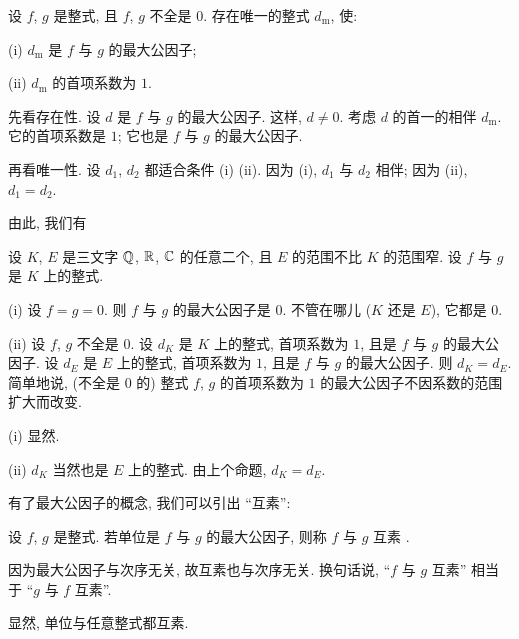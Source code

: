 \begin{proposition}
    设 $f$, $g$ 是整式, 且 $f$, $g$ 不全是 $0$. 存在唯一的整式 $d_\mathrm{m}$, 使:

    (i) $d_\mathrm{m}$ 是 $f$ 与 $g$ 的最大公因子;

    (ii) $d_\mathrm{m}$ 的首项系数为 $1$.
\end{proposition}

\begin{pf}
    先看存在性. 设 $d$ 是 $f$ 与 $g$ 的最大公因子. 这样, $d \neq 0$. 考虑 $d$ 的首一的相伴 $d_\mathrm{m}$. 它的首项系数是 $1$; 它也是 $f$ 与 $g$ 的最大公因子.

    再看唯一性. 设 $d_1$, $d_2$ 都适合条件 (i) (ii). 因为 (i), $d_1$ 与 $d_2$ 相伴; 因为 (ii), $d_1 = d_2$.
\end{pf}

由此, 我们有
\begin{proposition}
    设 $K$, $E$ 是三文字 $\mathbb{Q}$, $\mathbb{R}$, $\mathbb{C}$ 的任意二个, 且 $E$ 的范围不比 $K$ 的范围窄. 设 $f$ 与 $g$ 是 $K$ 上的整式.

    (i) 设 $f = g = 0$. 则 $f$ 与 $g$ 的最大公因子是 $0$. 不管在哪儿 ($K$ 还是 $E$), 它都是 $0$.

    (ii) 设 $f$, $g$ 不全是 $0$. 设 $d_K$ 是 $K$ 上的整式, 首项系数为 $1$, 且是 $f$ 与 $g$ 的最大公因子. 设 $d_E$ 是 $E$ 上的整式, 首项系数为 $1$, 且是 $f$ 与 $g$ 的最大公因子. 则 $d_K = d_E$. 简单地说, (不全是 $0$ 的) 整式 $f$, $g$ 的首项系数为 $1$ 的最大公因子不因系数的范围扩大而改变.
\end{proposition}

\begin{pf}
    (i) 显然.

    (ii) $d_K$ 当然也是 $E$ 上的整式. 由上个命题, $d_K = d_E$.
\end{pf}

有了最大公因子的概念, 我们可以引出 ``互素'':
\begin{definition}
    设 $f$, $g$ 是整式. 若单位是 $f$ 与 $g$ 的最大公因子, 则称 $f$ 与 $g$ 互素 .
\end{definition}

\begin{remark}
    因为最大公因子与次序无关, 故互素也与次序无关. 换句话说, ``$f$ 与 $g$ 互素'' 相当于 ``$g$ 与 $f$ 互素''.
\end{remark}

\begin{example}
    显然, 单位与任意整式都互素.
\end{example}

